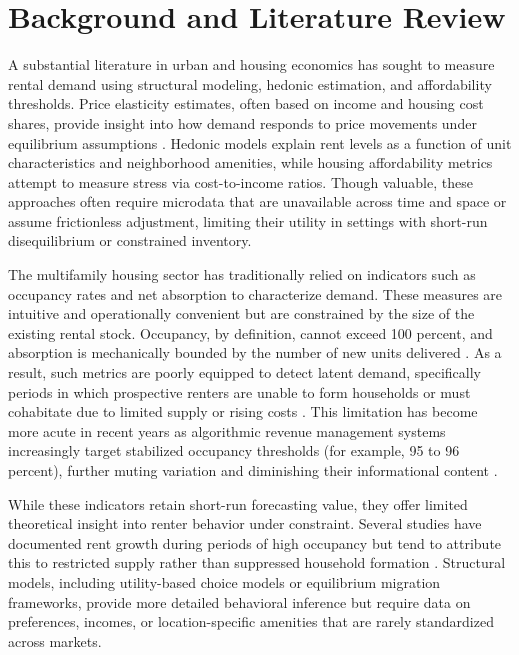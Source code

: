 \documentclass[APA,Times1COL]{WileyNJDv5} %
\begin{document}
\section{Background and Literature Review}
\label{sec2}

A substantial literature in urban and housing economics has sought to measure rental demand using structural modeling, hedonic estimation, and affordability thresholds. Price elasticity estimates, often based on income and housing cost shares, provide insight into how demand responds to price movements under equilibrium assumptions \cite{green2002measuring, malpezzi1996rent}. Hedonic models explain rent levels as a function of unit characteristics and neighborhood amenities, while housing affordability metrics attempt to measure stress via cost-to-income ratios. Though valuable, these approaches often require microdata that are unavailable across time and space or assume frictionless adjustment, limiting their utility in settings with short-run disequilibrium or constrained inventory.

The multifamily housing sector has traditionally relied on indicators such as occupancy rates and net absorption to characterize demand. These measures are intuitive and operationally convenient but are constrained by the size of the existing rental stock. Occupancy, by definition, cannot exceed 100 percent, and absorption is mechanically bounded by the number of new units delivered \cite{mueller1999real, gabriel2001rental}. As a result, such metrics are poorly equipped to detect latent demand, specifically periods in which prospective renters are unable to form households or must cohabitate due to limited supply or rising costs \cite{sirmans1991determinants, pyhrr1999real}. This limitation has become more acute in recent years as algorithmic revenue management systems increasingly target stabilized occupancy thresholds (for example, 95 to 96 percent), further muting variation and diminishing their informational content \cite{calder2024coordinated}.

While these indicators retain short-run forecasting value, they offer limited theoretical insight into renter behavior under constraint. Several studies have documented rent growth during periods of high occupancy but tend to attribute this to restricted supply rather than suppressed household formation \cite{goodman1992rental, wheaton1991realestate}. Structural models, including utility-based choice models \cite{rosenthal1997housing} or equilibrium migration frameworks, provide more detailed behavioral inference but require data on preferences, incomes, or location-specific amenities that are rarely standardized across markets.
\end{document}
